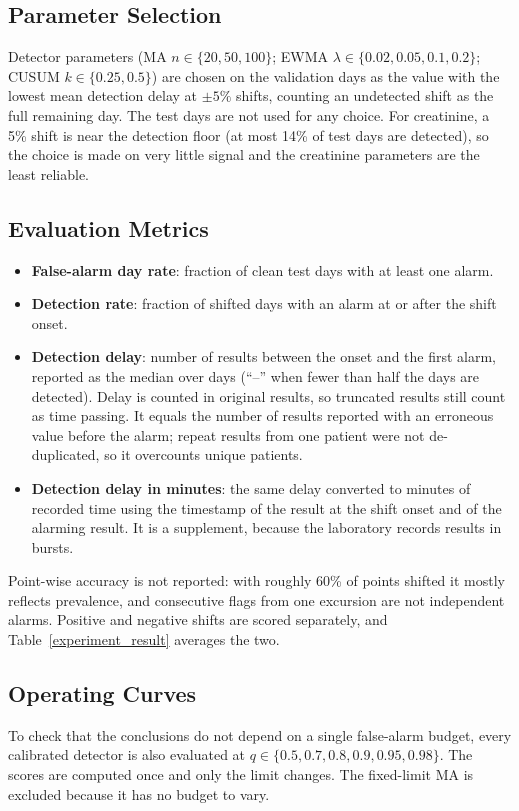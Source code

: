 \documentclass[conference]{IEEEtran}
\begin{document}
\subsection{Parameter Selection}
Detector parameters (MA $n\in\{20,50,100\}$; EWMA $\lambda\in\{0.02,0.05,0.1,0.2\}$; CUSUM $k\in\{0.25,0.5\}$) are chosen on the validation days as the value with the lowest mean detection delay at $\pm5\%$ shifts, counting an undetected shift as the full remaining day. The test days are not used for any choice. For creatinine, a 5\% shift is near the detection floor (at most 14\% of test days are detected), so the choice is made on very little signal and the creatinine parameters are the least reliable.

\subsection{Evaluation Metrics}
\begin{itemize}
  \item \textbf{False-alarm day rate}: fraction of clean test days with at least one alarm.
  \item \textbf{Detection rate}: fraction of shifted days with an alarm at or after the shift onset.
  \item \textbf{Detection delay}: number of results between the onset and the first alarm, reported as the median over days (``--'' when fewer than half the days are detected). Delay is counted in original results, so truncated results still count as time passing. It equals the number of results reported with an erroneous value before the alarm; repeat results from one patient were not de-duplicated, so it overcounts unique patients.
  \item \textbf{Detection delay in minutes}: the same delay converted to minutes of recorded time using the timestamp of the result at the shift onset and of the alarming result. It is a supplement, because the laboratory records results in bursts.
\end{itemize}
Point-wise accuracy is not reported: with roughly 60\% of points shifted it mostly reflects prevalence, and consecutive flags from one excursion are not independent alarms. Positive and negative shifts are scored separately, and Table~\ref{experiment_result} averages the two.

\subsection{Operating Curves}
To check that the conclusions do not depend on a single false-alarm budget, every calibrated detector is also evaluated at $q\in\{0.5,0.7,0.8,0.9,0.95,0.98\}$. The scores are computed once and only the limit changes. The fixed-limit MA is excluded because it has no budget to vary.
\end{document}
